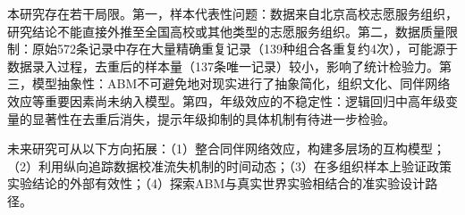 \documentclass[12pt,a4paper]{article}
\begin{document}
本研究存在若干局限。第一，样本代表性问题：数据来自北京高校志愿服务组织，研究结论不能直接外推至全国高校或其他类型的志愿服务组织。第二，数据质量限制：原始572条记录中存在大量精确重复记录（139种组合各重复约4次），可能源于数据录入过程，去重后的样本量（137条唯一记录）较小，影响了统计检验力。第三，模型抽象性：ABM不可避免地对现实进行了抽象简化，组织文化、同伴网络效应等重要因素尚未纳入模型。第四，年级效应的不稳定性：逻辑回归中高年级变量的显著性在去重后消失，提示年级抑制的具体机制有待进一步检验。

未来研究可从以下方向拓展：（1）整合同伴网络效应，构建多层场的互构模型；（2）利用纵向追踪数据校准流失机制的时间动态；（3）在多组织样本上验证政策实验结论的外部有效性；（4）探索ABM与真实世界实验相结合的准实验设计路径。

\vspace{2em}


\end{document}
